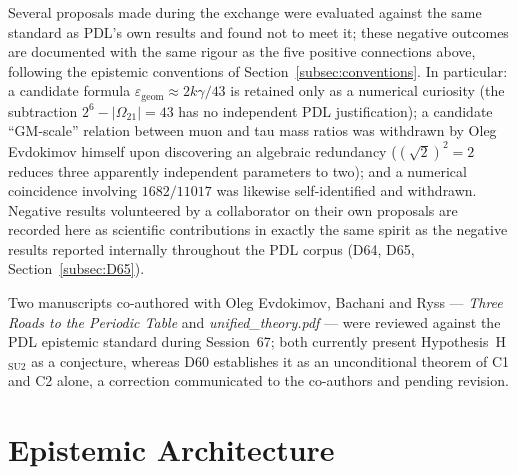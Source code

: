 \documentclass[11pt,a4paper]{article}
\theoremstyle{plain}
\theoremstyle{definition}
\theoremstyle{remark}
\begin{document}
Several proposals made during the exchange were evaluated against the same standard as PDL's own results and found not to meet it; these negative outcomes are documented with the same rigour as the five positive connections above, following the epistemic conventions of Section~\ref{subsec:conventions}. In particular: a candidate formula $\varepsilon_{\mathrm{geom}}\approx 2k\gamma/43$ is retained only as a numerical curiosity (the subtraction $2^6-|\Omega_{21}|=43$ has no independent PDL justification); a candidate ``GM-scale'' relation between muon and tau mass ratios was withdrawn by Oleg Evdokimov himself upon discovering an algebraic redundancy ($(\sqrt{2})^2=2$ reduces three apparently independent parameters to two); and a numerical coincidence involving $1682/11017$ was likewise self-identified and withdrawn. Negative results volunteered by a collaborator on their own proposals are recorded here as scientific contributions in exactly the same spirit as the negative results reported internally throughout the PDL corpus (D64, D65, Section~\ref{subsec:D65}).

Two manuscripts co-authored with Oleg Evdokimov, Bachani and Ryss --- \emph{Three Roads to the Periodic Table} and \emph{unified\_theory.pdf} --- were reviewed against the PDL epistemic standard during Session~67; both currently present Hypothesis~H$_{\mathrm{SU2}}$ as a conjecture, whereas D60 establishes it as an unconditional theorem of C1 and C2 alone, a correction communicated to the co-authors and pending revision.

\section{Epistemic Architecture}
\label{sec:epistemic}
\end{document}
